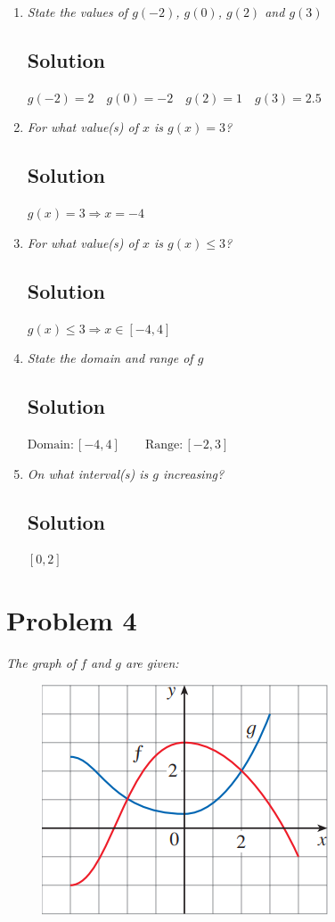 \documentclass[11pt]{article}
\begin{document}
\begin{enumerate}
	\item \textit{State the values of $g(-2)$, $g(0)$, $g(2)$ and $g(3)$}
	\subsection*{Solution}
	$g(-2)=2 \quad g(0)=-2 \quad g(2)=1 \quad g(3)=2.5$
	
	\item \textit{For what value(s) of $x$ is $g(x)=3$?}
	\subsection*{Solution}
	$g(x)=3 \Rightarrow x=-4$
	
	\item \textit{For what value(s) of $x$ is $g(x) \leq 3$?}
	\subsection*{Solution}
	$g(x) \leq 3 \Rightarrow x \in [-4,4]$
	
	\item \textit{State the domain and range of $g$}
	\subsection*{Solution}
	$\mathrm{Domain}:[-4,4] \qquad\mathrm{Range}:[-2,3]$
	
	\item \textit{On what interval(s) is $g$ increasing?}
	\subsection*{Solution}
	$[0,2]$
\end{enumerate}

\section*{Problem 4}

\textit{The graph of $f$ and $g$ are given:}

\begin{figure}[h]
	\centering
	\includegraphics[width=0.3\linewidth]{figs/1.1.4}
\end{figure}
\end{document}
